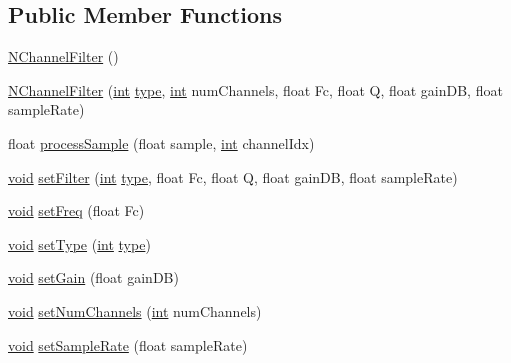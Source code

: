 \subsection*{Public Member Functions}
\begin{DoxyCompactItemize}
\item 
\hyperlink{class_audealize_1_1_n_channel_filter_acc6d3d78401e206842648266e95de06f}{N\+Channel\+Filter} ()
\item 
\hyperlink{class_audealize_1_1_n_channel_filter_a983b87834355f20e3f8ecdf8bd939c84}{N\+Channel\+Filter} (\hyperlink{tk_8h_a83f82f76e7fed06f4c49d2db94028a6d}{int} \hyperlink{class_audealize_1_1_n_channel_filter_aa3b51c2ea2faf3df7c9b8e55fe96568d}{type}, \hyperlink{tk_8h_a83f82f76e7fed06f4c49d2db94028a6d}{int} num\+Channels, float Fc, float Q, float gain\+DB, float sample\+Rate)
\item 
float \hyperlink{class_audealize_1_1_n_channel_filter_ad9e59288f93255e0c31e1e83dd80928f}{process\+Sample} (float sample, \hyperlink{tk_8h_a83f82f76e7fed06f4c49d2db94028a6d}{int} channel\+Idx)
\item 
\hyperlink{tk_8h_aba408b7cd755a96426e004c015f5de8e}{void} \hyperlink{class_audealize_1_1_n_channel_filter_a2d5867f9fb2c4c7b8f73ac5620ab7eb6}{set\+Filter} (\hyperlink{tk_8h_a83f82f76e7fed06f4c49d2db94028a6d}{int} \hyperlink{class_audealize_1_1_n_channel_filter_aa3b51c2ea2faf3df7c9b8e55fe96568d}{type}, float Fc, float Q, float gain\+DB, float sample\+Rate)
\item 
\hyperlink{tk_8h_aba408b7cd755a96426e004c015f5de8e}{void} \hyperlink{class_audealize_1_1_n_channel_filter_a4213694ea47179d3387e1c64288f29df}{set\+Freq} (float Fc)
\item 
\hyperlink{tk_8h_aba408b7cd755a96426e004c015f5de8e}{void} \hyperlink{class_audealize_1_1_n_channel_filter_ab104c9dfb0692cd0623dea3f22033fd5}{set\+Type} (\hyperlink{tk_8h_a83f82f76e7fed06f4c49d2db94028a6d}{int} \hyperlink{class_audealize_1_1_n_channel_filter_aa3b51c2ea2faf3df7c9b8e55fe96568d}{type})
\item 
\hyperlink{tk_8h_aba408b7cd755a96426e004c015f5de8e}{void} \hyperlink{class_audealize_1_1_n_channel_filter_a5c62308bbba1feb99c3d2fc633d3f055}{set\+Gain} (float gain\+DB)
\item 
\hyperlink{tk_8h_aba408b7cd755a96426e004c015f5de8e}{void} \hyperlink{class_audealize_1_1_n_channel_filter_ad901f2c36cad41011670f05badb7bf45}{set\+Num\+Channels} (\hyperlink{tk_8h_a83f82f76e7fed06f4c49d2db94028a6d}{int} num\+Channels)
\item 
\hyperlink{tk_8h_aba408b7cd755a96426e004c015f5de8e}{void} \hyperlink{class_audealize_1_1_n_channel_filter_ad8b99b93cbe402948f007c9dde8e48bf}{set\+Sample\+Rate} (float sample\+Rate)

\end{DoxyCompactItemize}
